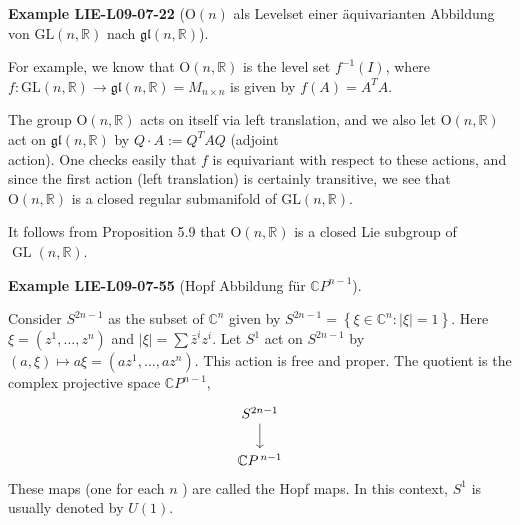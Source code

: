 \documentclass[10pt, letterpaper]{article}
\newcommand{\R}{\mathbb{R}}
\newcommand{\GL}{\mathrm{GL}}
\newcommand{\Ogroup}{\mathrm{O}} %
\newcommand{\CustomHeading}[3]{%
  \par\medskip\noindent%
  \textbf{#1 #2} \textnormal{(#3)}.\enskip%
}
\newenvironment{EXA}[2]{\CustomHeading{Example}{#1}{#2}}{}
\begin{document}
\begin{EXA}{LIE-L09-07-22}{$\Ogroup(n)$ als Levelset einer äquivarianten Abbildung von $\GL(n,\R)$ nach $\mathfrak{gl}(n,\R)$}
For example, we know that $\mathrm{O}(n, \mathbb{R})$ is the level set $f^{-1}(I)$, where $f: \mathrm{GL}(n, \mathbb{R}) \rightarrow \mathfrak{g} \mathfrak{l}(n, \mathbb{R})=M_{n \times n}$ is given by $f(A)=A^{T} A$. 

The group $\mathrm{O}(n, \mathbb{R})$ acts on itself via left translation, and we also let $\mathrm{O}(n, \mathbb{R})$ act on $\mathfrak{g} \mathfrak{l}(n, \mathbb{R})$ by $Q \cdot A:=Q^{T} A Q$ (adjoint\\
action). One checks easily that $f$ is equivariant with respect to these actions, and since the first action (left translation) is certainly transitive, we see that $\mathrm{O}(n, \mathbb{R})$ is a closed regular submanifold of $\mathrm{GL}(n, \mathbb{R})$.

It follows from Proposition 5.9 that $\mathrm{O}(n, \mathbb{R})$ is a closed Lie subgroup of $\operatorname{GL}(n, \mathbb{R})$.
\end{EXA}

\begin{EXA}{LIE-L09-07-55}{Hopf Abbildung für $\mathbb{C}P^{n-1}$}
Consider $S^{2 n-1}$ as the subset of $\mathbb{C}^{n}$ given by $S^{2 n-1}= \left\{\xi \in \mathbb{C}^{n}:|\xi|=1\right\}$. Here $\xi=\left(z^{1}, \ldots, z^{n}\right)$ and $|\xi|=\sum \bar{z}^{i} z^{i}$. Let $S^{1}$ act on $S^{2 n-1}$ by $(a, \xi) \mapsto a \xi=\left(a z^{1}, \ldots, a z^{n}\right)$. This action is free and proper. The quotient is the complex projective space $\mathbb{C} P^{n-1}$,
\[
\begin{tikzcd}
S^{2n-1} \arrow[d] \\
\mathbb{C}P^{\,n-1}
\end{tikzcd}
\]
These maps (one for each $n$ ) are called the Hopf maps. In this context, $S^{1}$ is usually denoted by $U(1)$.
\end{EXA}
\end{document}
